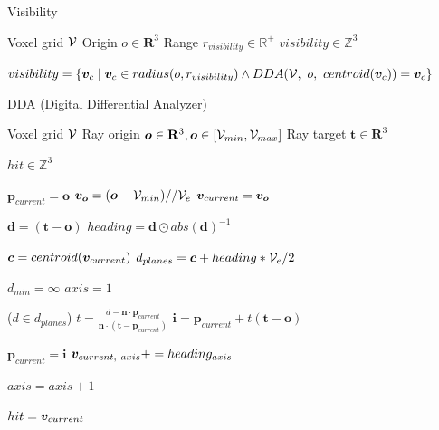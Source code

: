 \begin{algorithm}
    \caption{Visibility}
    \begin{algorithmic}

    \Require \quad Voxel grid \(\mathcal{V}\)
    \Require \quad Origin \(o \in \mathbf{R}^3\)
    \Require \quad Range \(r_{visibility} \in \mathbb{R}^+\)
    \Ensure \quad $visibility \in \mathbb{Z}^{3}$

    \State $visibility = \{\boldsymbol{v}_c \mid \boldsymbol{v}_c \in radius(o, r_{visibility}) \land DDA(\mathcal{V},\ o,\ centroid(\boldsymbol{v}_c)) = \boldsymbol{v}_c\}$

    \end{algorithmic}
\end{algorithm}

\begin{algorithm}
    \caption{DDA (Digital Differential Analyzer)}
    \begin{algorithmic}

    \Require \quad Voxel grid \(\mathcal{V}\)
    \Require \quad Ray origin \(\boldsymbol{o} \in \mathbf{R}^3, \boldsymbol{o} \in [\mathcal{V}_{min}, \mathcal{V}_{max}]\)
    \Require \quad Ray target \(\boldsymbol{t} \in \mathbf{R}^3\)

    \Ensure \quad $hit \in \mathbb{Z}^{3}$ 

    \State $\boldsymbol{p}_{current} = \boldsymbol{o}$
    \State $\boldsymbol{v}_{\boldsymbol{o}} = (\boldsymbol{o} - \mathcal{V}_{min})//\mathcal{V}_{e}$
    \State $\boldsymbol{v}_{current} = \boldsymbol{v}_{\boldsymbol{o}}$

    \State $\boldsymbol{d} = (\boldsymbol{t} - \boldsymbol{o})$ 
    \State $heading = \boldsymbol{d} \odot abs(\boldsymbol{d})^{-1}$ 

        \State $\boldsymbol{c} = centroid(\boldsymbol{v}_{current})$
        \State $d_{planes} = \boldsymbol{c} + heading*\mathcal{V}_{e}/2$

        \State $d_{min} = \infty$
        \State $axis=1$

        \ForEach($d \in d_{planes}$)
            \State $t = \frac{d - \boldsymbol{n} \cdot \boldsymbol{p}_{current}}{\boldsymbol{n} \cdot (\boldsymbol{t} - \boldsymbol{p}_{current})}$
            \State $\boldsymbol{i} = \boldsymbol{p}_{current} + t(\boldsymbol{t} - \boldsymbol{o})$

                \State $\boldsymbol{p}_{current} = \boldsymbol{i}$
                \State $\boldsymbol{v}_{current,\ axis} += heading_{axis}$
            \EndIf

            \State $axis=axis+1$
        \EndFor

    \State $hit = \boldsymbol{v}_{current}$
    \EndWhile

\end{algorithmic}
\end{algorithm}

